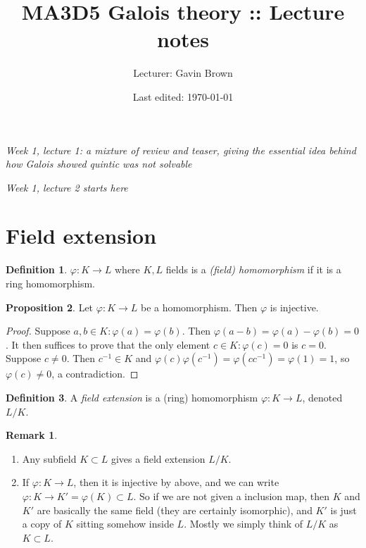 \documentclass[a4paper]{article}
\title{\vspace{-2mm}MA3D5 Galois theory :: Lecture notes}
\author{Lecturer: Gavin Brown}
\date{Last edited: \today}
\theoremstyle{definition}
\newtheorem{defn}{Definition}[subsection]
\newtheorem{prop}[defn]{Proposition}
\newtheorem*{remark}{Remark}
\begin{document}
\maketitle
\thispagestyle{empty}

\tableofcontents
\thispagestyle{empty}
\newpage
\setcounter{page}{1}
\begin{flushright}
\textit{Week 1, lecture 1: a mixture of review and teaser, giving the essential idea behind how Galois showed quintic was not solvable}

\textit{Week 1, lecture 2 starts here}
\end{flushright}
\section{Field extension}
\begin{defn}
$\varphi:K\rightarrow L$ where $K,L$ fields is a \textit{(field) homomorphism} if it is a ring homomorphism.
\end{defn}
\begin{prop}
\label{prop:fieldhomisinj}
Let $\varphi:K\rightarrow L$ be a homomorphism. Then $\varphi$ is injective.
\end{prop}
\begin{proof}
Suppose $a,b\in K:\varphi(a)=\varphi(b)$. Then $\varphi(a-b)=\varphi(a)-\varphi(b)=0$. It then suffices to prove that the only element $c\in K:\varphi(c)=0$ is $c=0$. Suppose $c\neq 0$. Then $c^{-1}\in K$ and $\varphi(c)\varphi(c^{-1})=\varphi(cc^{-1})=\varphi(1)=1$, so $\varphi(c)\neq 0$, a contradiction.
\end{proof}
\begin{defn}
A \textit{field extension} is a (ring) homomorphism $\varphi:K\rightarrow L$, denoted $L/K$.
\end{defn}
\begin{remark}
\begin{enumerate}
\item Any subfield $K\subset L$ gives a field extension $L/K$.
\item If $\varphi:K\rightarrow L$, then it is injective by above, and we can write $\varphi:K\rightarrow K'=\varphi(K)\subset L$. So if we are not given a inclusion map, then $K$ and $K'$ are basically the same field (they are certainly isomorphic), and $K'$ is just a copy of $K$ sitting somehow inside $L$. Mostly we simply think of $L/K$ as $K\subset L$.
\end{enumerate}
\end{remark}
\end{document}
